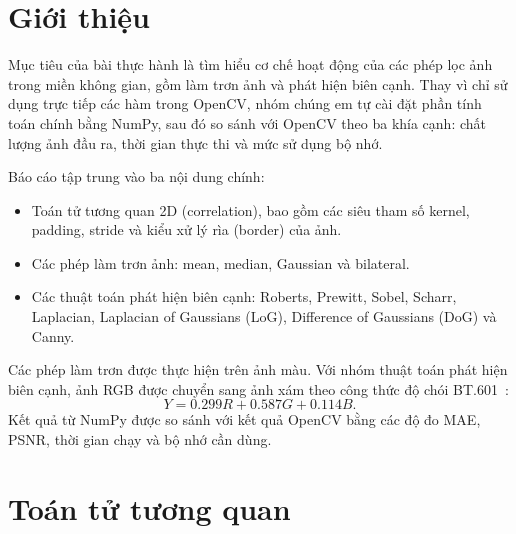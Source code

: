 \documentclass[12pt]{article}
\numberwithin{equation}{section}
\begin{document}
\fontsize{12pt}{15pt}\selectfont
\setlength{\parskip}{4pt}

\hypersetup{pageanchor=false}

\hypersetup{pageanchor=true}

\tableofcontents
\newpage

% 
\section{Giới thiệu}

Mục tiêu của bài thực hành là tìm hiểu cơ chế hoạt động của các phép lọc ảnh trong miền không gian, gồm làm trơn ảnh và phát hiện biên cạnh. Thay vì chỉ sử dụng trực tiếp các hàm trong OpenCV, nhóm chúng em tự cài đặt phần tính toán chính bằng NumPy, sau đó so sánh với OpenCV theo ba khía cạnh: chất lượng ảnh đầu ra, thời gian thực thi và mức sử dụng bộ nhớ.

Báo cáo tập trung vào ba nội dung chính:
\begin{itemize}
  \item Toán tử tương quan 2D (correlation), bao gồm các siêu tham số kernel, padding, stride và kiểu xử lý rìa (border) của ảnh.
  \item Các phép làm trơn ảnh: mean, median, Gaussian và bilateral.
  \item Các thuật toán phát hiện biên cạnh: Roberts, Prewitt, Sobel, Scharr, Laplacian, Laplacian of Gaussians (LoG), Difference of Gaussians (DoG) và Canny.
\end{itemize}

Các phép làm trơn được thực hiện trên ảnh màu. Với nhóm thuật toán phát hiện biên cạnh, ảnh RGB được chuyển sang ảnh xám theo công thức độ chói BT.601~\cite{bt601}:
\begin{equation}
Y = 0.299R + 0.587G + 0.114B.
\label{eq:gray}
\end{equation}
Kết quả từ NumPy được so sánh với kết quả OpenCV bằng các độ đo MAE, PSNR, thời gian chạy và bộ nhớ cần dùng.

\section{Toán tử tương quan}
\end{document}
